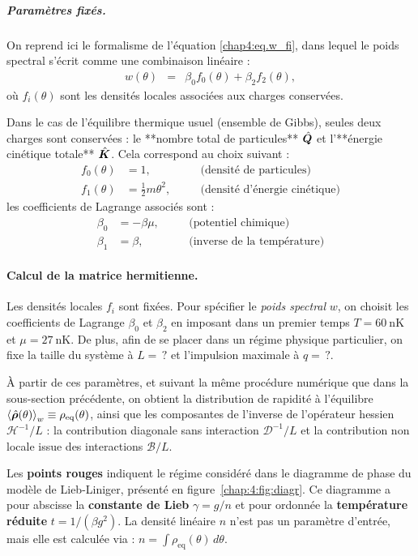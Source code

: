 \subparagraph{Paramètres fixés.}
On reprend ici le formalisme de l’équation \eqref{chap4:eq.w_fi}, dans lequel le poids spectral s’écrit comme une combinaison linéaire :
\begin{eqnarray*}
	w(\theta) & = & \beta_0 f_0(\theta) + \beta_2 f_2(\theta),
\end{eqnarray*}
où \( f_i(\theta) \) sont les densités locales associées aux charges conservées.

Dans le cas de l’équilibre thermique usuel (ensemble de Gibbs), seules deux charges sont conservées : le **nombre total de particules** \( \hat{\bm{Q}} \) et l’**énergie cinétique totale** \( \hat{\bm{K}} \). Cela correspond au choix suivant :
\begin{align*}
	f_0(\theta) &= 1, \quad &&\text{(densité de particules)} \\
	f_1(\theta) &= \frac{1}{2}m \theta^2, \quad &&\text{(densité d’énergie cinétique)}
\end{align*}
les coefficients de Lagrange associés sont :
\begin{align*}
	\beta_0 &= -\beta \mu, \quad &&\text{(potentiel chimique)} \\
	\beta_1 &= \beta, \quad &&\text{(inverse de la température)}
\end{align*}

\paragraph{Calcul de la matrice hermitienne.}

Les densités locales $f_i$ sont fixées. Pour spécifier le {\em poids spectral} $w$, on choisit les coefficients de Lagrange $\beta_0$ et $\beta_2$ en imposant dans un premier temps \( T = 60~\mathrm{nK} \) et \( \mu = 27~\mathrm{nK} \). De plus, afin de se placer dans un régime physique particulier, on fixe la taille du système à \( L = \, ? \) et l'impulsion maximale à \( q = \, ? \).

À partir de ces paramètres, et suivant la même procédure numérique que dans la sous-section précédente, on obtient la distribution de rapidité à l'équilibre \( \braket{\hat{\bm{\rho}}(\theta)}_w \equiv \rho_{\mathrm{eq}}(\theta) \), ainsi que les composantes de l’inverse de l’opérateur hessien \( \mathcal{H}^{-1}/L \) : la contribution diagonale sans interaction \( \mathcal{D}^{-1}/L \) et la contribution non locale issue des interactions \( \mathcal{B}/L \).

\medskip

Les {\bf points rouges} indiquent le régime considéré dans le diagramme de phase du modèle de Lieb-Liniger, présenté en figure~\ref{chap:4:fig:diagr}.  
Ce diagramme a pour abscisse la {\bf constante de Lieb} \( \gamma = g/n \) et pour ordonnée la {\bf température réduite} \( t = 1/(\beta g^2) \).  
La densité linéaire \( n \) n’est pas un paramètre d’entrée, mais elle est calculée via :
\(
n = \int \rho_{\mathrm{eq}}(\theta) \, d\theta.
\)

